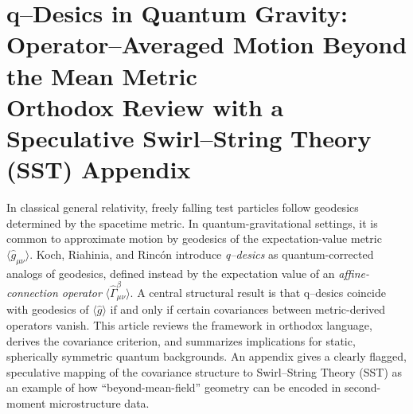 \documentclass[11pt,a4paper]{article}
\theoremstyle{thmstyleone}
\theoremstyle{thmstyletwo}
\theoremstyle{thmstylethree}
\begin{document}
    \newcommand{\vswirl}{\mathbf{v}_{\!\boldsymbol{\circlearrowleft}}}
    \newcommand{\rhoF}{\rho_{\!f}}
    \newcommand{\rhoE}{\rho_{\!E}}
    \newcommand{\rhoM}{\rho_{\!m}}
    \newcommand{\rc}{r_c}

    \section{q--Desics in Quantum Gravity: Operator--Averaged Motion Beyond the Mean Metric\\
    \large Orthodox Review with a Speculative Swirl--String Theory (SST) Appendix}



            In classical general relativity, freely falling test particles follow geodesics determined by the spacetime metric.
            In quantum-gravitational settings, it is common to approximate motion by geodesics of the expectation-value metric
            $\langle \hat g_{\mu\nu}\rangle$. Koch, Riahinia, and Rinc\'on introduce \emph{q--desics} as quantum-corrected analogs of
            geodesics, defined instead by the expectation value of an \emph{affine-connection operator} $\langle \hat\Gamma^\beta_{\mu\nu}\rangle$.
            A central structural result is that q--desics coincide with geodesics of $\langle \hat g\rangle$ if and only if certain covariances
            between metric-derived operators vanish. This article reviews the framework in orthodox language, derives the covariance criterion,
            and summarizes implications for static, spherically symmetric quantum backgrounds. An appendix gives a clearly flagged, speculative
            mapping of the covariance structure to Swirl--String Theory (SST) as an example of how ``beyond-mean-field'' geometry can be encoded
            in second-moment microstructure data.




\end{document}
